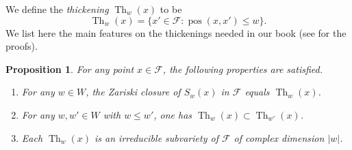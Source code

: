 \documentclass[12pt]{amsbook}%
\newtheorem{prop}[thm]{Proposition}
\theoremstyle{definition}
\theoremstyle{remark}
\numberwithin{section}{chapter}
\numberwithin{subsection}{section}
\numberwithin{figure}{chapter}
\DeclareMathOperator{\Th}{Th}
\def\cF{{\mathscr{F}}}
\begin{document}
{{ We define the \textit{thickening} $\Th_w(x)$ to be
\[\Th_w(x)=\{x'\in \cF: \operatorname{pos}(x,x')\leq w\}.\]
We list here the main features on the thickenings needed in our book (see \cite{brion_lectures, KLP18} for the proofs).
\begin{prop} \label{prop_listing_thickenings}
	For any point $x \in \cF$, the following properties are satisfied. 
	\begin{enumerate}
\item[(i)] For any $w\in W$,  the Zariski closure of $S_w(x)$ in $\cF$ equals $\Th_w(x)$. 
\item[(ii)] For any $w , w' \in W$ with $w\leqslant w'$, one has $\Th_w(x) \subset \Th_{w'}(x)$. 
\item[(iii)] Each $\Th_w(x)$ is an irreducible subvariety of $\cF$ of complex dimension $|w|$.  
	\end{enumerate}
\end{prop}


}}
\end{document}
